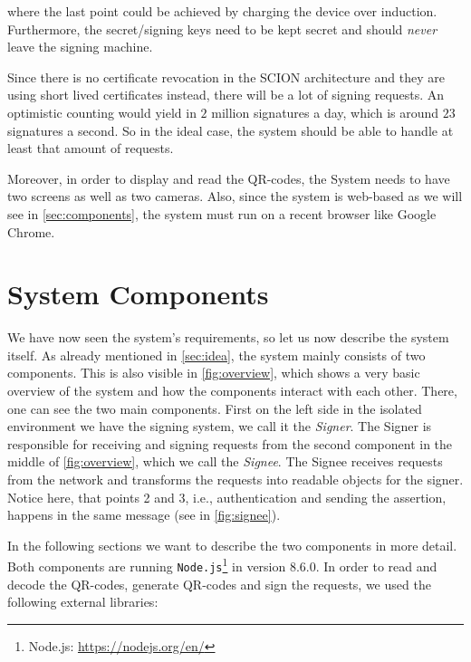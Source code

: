 where the last point could be achieved by charging the device over induction. Furthermore, the secret/signing keys need to be kept secret and should \emph{never} leave the signing machine.

Since there is no certificate revocation in the SCION architecture \cite{scion_book} and they are using short lived certificates instead, there will be a lot of signing requests. An optimistic counting would yield in $2$ million signatures a day, which is around $23$ signatures a second. So in the ideal case, the system should be able to handle at least that amount of requests.

Moreover, in order to display and read the QR-codes, the System needs to have two screens as well as two cameras. Also, since the system is web-based as we will see in \autoref{sec:components}, the system must run on a recent browser like Google Chrome.


\section{System Components}\label{sec:components}
We have now seen the system's requirements, so let us now describe the system itself. As already mentioned in \autoref{sec:idea}, the system mainly consists of two components. This is also visible in \autoref{fig:overview}, which shows a very basic overview of the system and how the components interact with each other. There, one can see the two main components. First on the left side in the isolated environment we have the signing system, we call it the \emph{Signer}. The Signer is responsible for receiving and signing requests from the second component in the middle of \autoref{fig:overview}, which we call the \emph{Signee}. The Signee receives requests from the network and transforms the requests into readable objects for the signer. Notice here, that points 2 and 3, i.e., authentication and sending the assertion, happens in the same message (see in \autoref{fig:signee}).

In the following sections we want to describe the two components in more detail. Both components are running \texttt{Node.js}\footnote{Node.js: \url{https://nodejs.org/en/}} in version $8.6.0$. In order to read and decode the QR-codes, generate QR-codes and sign the requests, we used the following external libraries:

